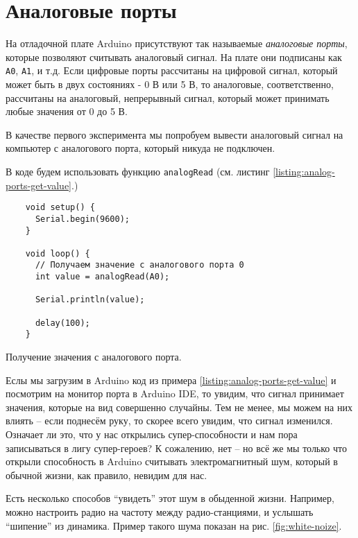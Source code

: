 \documentclass[../sparc.tex]{subfiles}
\begin{document}
\section{Аналоговые порты}
\label{section:analog-ports}

На отладочной плате Arduino присутствуют так называемые \emph{аналоговые порты},
которые позволяют считывать аналоговый сигнал.  На плате они подписаны как
\texttt{A0}, \texttt{A1}, и т.д. Если цифровые порты рассчитаны на цифровой
сигнал, который может быть в двух состояниях - 0 В или 5 В, то аналоговые,
соответственно, рассчитаны на аналоговый, непрерывный сигнал, который может
принимать любые значения от 0 до 5 В.

В качестве первого эксперимента мы попробуем вывести аналоговый сигнал на
компьютер с аналогового порта, который никуда не подключен.

В коде будем использовать функцию \texttt{analogRead} (см. листинг
\ref{listing:analog-ports-get-value}.)

\begin{listing}[ht]
  \begin{verbatim}
    void setup() {
      Serial.begin(9600);
    }

    void loop() {
      // Получаем значение с аналогового порта 0
      int value = analogRead(A0);

      Serial.println(value);

      delay(100);
    }
  \end{verbatim}
  \label{listing:analog-ports-get-value}
  \caption{Получение значения с аналогового порта.}
\end{listing}

Еслы мы загрузим в Arduino код из примера \ref{listing:analog-ports-get-value} и
посмотрим на монитор порта в Arduino IDE, то увидим, что сигнал принимает
значения, которые на вид совершенно случайны. Тем не менее, мы можем на них
влиять -- если поднесём руку, то скорее всего увидим, что сигнал изменился.
Означает ли это, что у нас открылись супер-способности и нам пора записываться в
лигу супер-героев? К сожалению, нет -- но всё же мы только что открыли
способность в Arduino считывать электромагнитный шум, который в обычной жизни,
как правило, невидим для нас.

Есть несколько способов ``увидеть'' этот шум в обыденной жизни.  Например, можно
настроить радио на частоту между радио-станциями, и услышать ``шипение'' из
динамика.  Пример такого шума показан на рис. \ref{fig:white-noize}.
\end{document}
